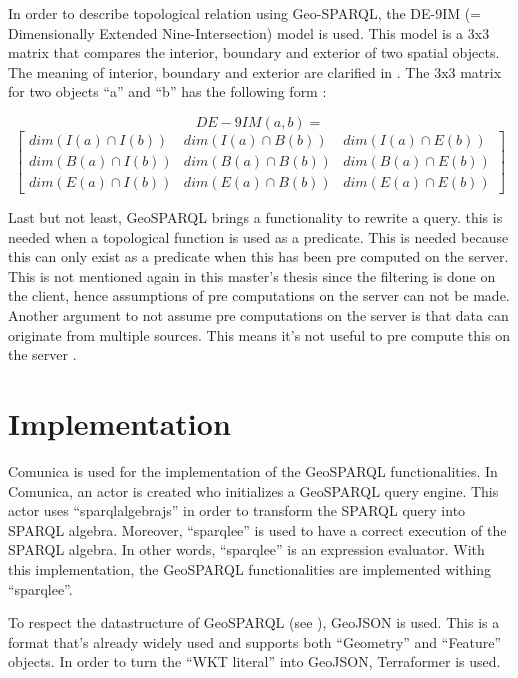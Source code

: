 \documentclass[twocolumn]{phdsymp} %
\begin{document}
In order to describe topological relation using Geo-SPARQL, the DE-9IM (= Dimensionally Extended Nine-Intersection) model is used. This model is a 3x3 matrix that compares the interior, boundary and exterior of two spatial objects. The meaning of interior, boundary and exterior are clarified in . The 3x3 matrix for two objects ``a'' and ``b'' has the following form \cite{shen2018classification}:

\begin{equation*}
    DE-9IM(a,b) = 
\end{equation*}
\begin{equation*}
    \begin{bmatrix}
        dim(I(a)\cap I(b)) & dim(I(a)\cap B(b)) & dim(I(a)\cap E(b))\\
        dim(B(a)\cap I(b)) & dim(B(a)\cap B(b)) & dim(B(a)\cap E(b))\\
        dim(E(a)\cap I(b)) & dim(E(a)\cap B(b)) & dim(E(a)\cap E(b))
    \end{bmatrix}
\end{equation*}

Last but not least, GeoSPARQL brings a functionality to rewrite a query. this is needed when a topological function is used as a predicate. This is needed because this can only exist as a predicate when this has been pre computed on the server. This is not mentioned again in this master's thesis since the filtering is done on the client, hence assumptions of pre computations on the server can not be made. Another argument to not assume pre computations on the server is that data can originate from multiple sources. This means it's not useful to pre compute this on the server \cite{ogcdocs}.

\section{Implementation}
Comunica is used for the implementation of the GeoSPARQL functionalities. In Comunica, an actor is created who initializes a GeoSPARQL query engine. This actor uses ``sparqlalgebrajs'' in order to transform the SPARQL query into SPARQL algebra. Moreover, ``sparqlee'' is used to have a correct execution of the SPARQL algebra. In other words, ``sparqlee'' is an expression evaluator. With this implementation, the GeoSPARQL functionalities are implemented withing ``sparqlee''. 

To respect the datastructure of GeoSPARQL (see ), GeoJSON is used. This is a format that's already widely used and supports both ``Geometry'' and ``Feature'' objects. In order to turn the ``WKT literal'' into GeoJSON, Terraformer is used.
\end{document}
